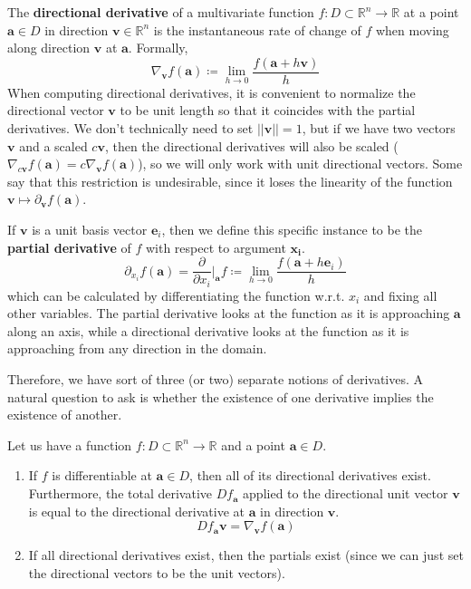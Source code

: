   \begin{definition}
    The \textbf{directional derivative} of a multivariate function $f: D \subset \mathbb{R}^n \longrightarrow \mathbb{R}$ at a point $\mathbf{a} \in D$ in direction $\mathbf{v} \in \mathbb{R}^n$ is the instantaneous rate of change of $f$ when moving along direction $\mathbf{v}$ at $\mathbf{a}$. Formally, 
    \[\nabla_\mathbf{v} f(\mathbf{a}) \coloneqq \lim_{h \rightarrow 0} \frac{f(\mathbf{a} + h \mathbf{v})}{h}\]
    When computing directional derivatives, it is convenient to normalize the directional vector $\mathbf{v}$ to be unit length so that it coincides with the partial derivatives. We don't technically need to set $||\mathbf{v}|| = 1$, but if we have two vectors $\mathbf{v}$ and a scaled $c \mathbf{v}$, then the directional derivatives will also be scaled ($\nabla_{c \mathbf{v}} f (\mathbf{a}) = c \nabla_{\mathbf{v}} f (\mathbf{a})$), so we will only work with unit directional vectors. Some say that this restriction is undesirable, since it loses the linearity of the function $\mathbf{v} \mapsto \partial_\mathbf{v} f (\mathbf{a})$. 

    If $\mathbf{v}$ is a unit basis vector $\mathbf{e}_i$, then we define this specific instance to be the \textbf{partial derivative} of $f$ with respect to argument $\mathbf{x_i}$. 
    \[\partial_{x_i} f (\mathbf{a}) = \frac{\partial}{\partial x_i} \bigg|_{\mathbf{a}} f \coloneqq \lim_{h \rightarrow 0} \frac{f(\mathbf{a} + h \mathbf{e}_i)}{h} \]
    which can be calculated by differentiating the function w.r.t. $x_i$ and fixing all other variables. The partial derivative looks at the function as it is approaching $\mathbf{a}$ along an axis, while a directional derivative looks at the function as it is approaching from any direction in the domain. 
  \end{definition}

  Therefore, we have sort of three (or two) separate notions of derivatives. A natural question to ask is whether the existence of one derivative implies the existence of another. 

  \begin{theorem}
    Let us have a function $f: D \subset \mathbb{R}^n \longrightarrow \mathbb{R}$ and a point $\mathbf{a} \in D$. 
    \begin{enumerate}
      \item If $f$ is differentiable at $\mathbf{a} \in D$, then all of its directional derivatives exist. Furthermore, the total derivative $D f_\mathbf{a}$ applied to the directional unit vector $\mathbf{v}$ is equal to the directional derivative at $\mathbf{a}$ in direction $\mathbf{v}$.
      \begin{equation}
        D f_\mathbf{a} \mathbf{v} = \nabla_\mathbf{v} f (\mathbf{a})
      \end{equation}

      \item If all directional derivatives exist, then the partials exist (since we can just set the directional vectors to be the unit vectors). 
    \end{enumerate}
  \end{theorem} 

